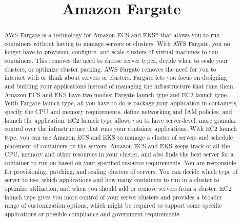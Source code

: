 \documentclass{article}
\begin{document}
\title{Amazon Fargate}
\maketitle
	\begin{abstract}

AWS Fargate is a technology for Amazon ECS and EKS* that allows you to run containers without having to manage servers or clusters. With AWS Fargate, you no longer have to provision, configure, and scale clusters of virtual machines to run containers. This removes the need to choose server types, decide when to scale your clusters, or optimize cluster packing. AWS Fargate removes the need for you to interact with or think about servers or clusters. Fargate lets you focus on designing and building your applications instead of managing the infrastructure that runs them.\\

Amazon ECS and EKS have two modes: Fargate launch type and EC2 launch type. With Fargate launch type, all you have to do is package your application in containers, specify the CPU and memory requirements, define networking and IAM policies, and launch the application. EC2 launch type allows you to have server-level, more granular control over the infrastructure that runs your container applications. With EC2 launch type, you can use Amazon ECS and EKS to manage a cluster of servers and schedule placement of containers on the servers. Amazon ECS and EKS keeps track of all the CPU, memory and other resources in your cluster, and also finds the best server for a container to run on based on your specified resource requirements. You are responsible for provisioning, patching, and scaling clusters of servers. You can decide which type of server to use, which applications and how many containers to run in a cluster to optimize utilization, and when you should add or remove servers from a cluster. EC2 launch type gives you more control of your server clusters and provides a broader range of customization options, which might be required to support some specific applications or possible compliance and government requirements. \cite{ref:fargate}


	
	
\end{abstract}
	
\end{document}
